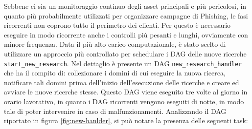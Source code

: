 Sebbene ci sia un monitoraggio continuo degli asset principali e più pericolosi,
in quanto più probabilmente utilizzati per organizzare campagne di Phishing, le fasi
ricorrenti non coprono tutto il perimetro dei clienti. Per questo è necessario
eseguire in modo ricorrente anche i controlli più pesanti e lunghi, ovviamente con
minore frequenza. Data il più alto carico computazionale, è stato scelto di utilizzare
un approccio più controllato per schedulare i DAG delle nuove ricerche \texttt{start\_new\_research}.
Nel dettaglio è presente un DAG \texttt{new\_research\_handler} che ha il
compito di: collezionare i domini di cui eseguire la nuova ricerca, notificare
tali domini prima dell'inizio dell'esecuzione delle ricerche e creare ed avviare
le nuove ricerche stesse. Questo DAG viene eseguito tre volte al giorno in orario
lavorativo, in quanto i DAG ricorrenti vengono eseguiti di notte, in modo tale di
poter intervenire in caso di malfunzionamenti. Analizzando il DAG riportato in
figura \ref{fig:new-hanlder}, si può notare la presenza delle seguenti task:

